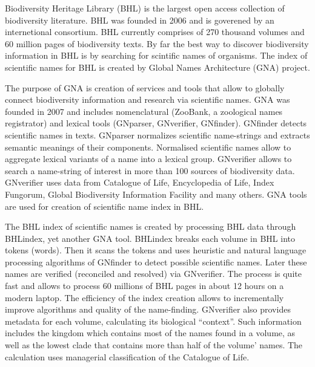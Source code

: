 \documentclass[
]{article}
\begin{document}
Biodiversity Heritage Library (BHL) is the largest open access
collection of biodiversity literature. BHL was founded in 2006 and is
goverened by an internetional consortium. BHL currently comprises of 270
thousand volumes and 60 million pages of biodiversity texts. By far the
best way to discover biodiversity information in BHL is by searching for
scintific names of organisms. The index of scientific names for BHL is
created by Global Names Architecture (GNA) project.

The purpose of GNA is creation of services and tools that allow to
globally connect biodiversity information and research via scientific
names. GNA was founded in 2007 and includes nomenclatural (ZooBank, a
zoological names registrator) and lexical tools (GNparser, GNverifier,
GNfinder). GNfinder detects scientific names in texts. GNparser
normalizes scientific name-strings and extracts semantic meanings of
their components. Normalised scientific names allow to aggregate lexical
variants of a name into a lexical group. GNverifier allows to search a
name-string of interest in more than 100 sources of biodiversity data.
GNverifier uses data from Catalogue of Life, Encyclopedia of Life, Index
Fungorum, Global Biodiversity Information Facility and many others. GNA
tools are used for creation of scientific name index in BHL.

The BHL index of scientific names is created by processing BHL data
through BHLindex, yet another GNA tool. BHLindex breaks each volume in
BHL into tokens (words). Then it scans the tokens and uses heuristic and
natural language processing algorithms of GNfinder to detect possible
scientific names. Later these names are verified (reconciled and
resolved) via GNverifier. The process is quite fast and allows to
process 60 millions of BHL pages in about 12 hours on a modern laptop.
The efficiency of the index creation allows to incrementally improve
algorithms and quality of the name-finding. GNverifier also provides
metadata for each volume, calculating its biological ``context''. Such
information includes the kingdom which contains most of the names found
in a volume, as well as the lowest clade that contains more than half of
the volume' names. The calculation uses managerial classification of the
Catalogue of Life.
\end{document}
